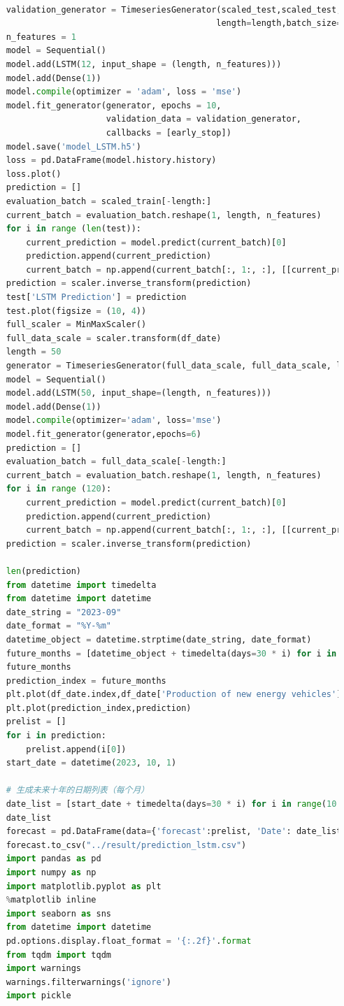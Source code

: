 \documentclass{apmcmthesis}
\begin{document}
\begin{lstlisting}[language=Python,caption={The Python Source code of Algorithm}]
    
    validation_generator = TimeseriesGenerator(scaled_test,scaled_test,
                                              length=length,batch_size=1)
    n_features = 1
    model = Sequential()
    model.add(LSTM(12, input_shape = (length, n_features)))
    model.add(Dense(1))
    model.compile(optimizer = 'adam', loss = 'mse')
    model.fit_generator(generator, epochs = 10, 
                        validation_data = validation_generator, 
                        callbacks = [early_stop])
    model.save('model_LSTM.h5')
    loss = pd.DataFrame(model.history.history)
    loss.plot()
    prediction = []
    evaluation_batch = scaled_train[-length:]
    current_batch = evaluation_batch.reshape(1, length, n_features)
    for i in range (len(test)):
        current_prediction = model.predict(current_batch)[0]
        prediction.append(current_prediction)
        current_batch = np.append(current_batch[:, 1:, :], [[current_prediction]], axis = 1)
    prediction = scaler.inverse_transform(prediction)
    test['LSTM Prediction'] = prediction
    test.plot(figsize = (10, 4))
    full_scaler = MinMaxScaler()
    full_data_scale = scaler.transform(df_date)
    length = 50 
    generator = TimeseriesGenerator(full_data_scale, full_data_scale, length=length, batch_size=1)
    model = Sequential()
    model.add(LSTM(50, input_shape=(length, n_features)))
    model.add(Dense(1))
    model.compile(optimizer='adam', loss='mse')
    model.fit_generator(generator,epochs=6)
    prediction = []
    evaluation_batch = full_data_scale[-length:]
    current_batch = evaluation_batch.reshape(1, length, n_features)
    for i in range (120):
        current_prediction = model.predict(current_batch)[0]
        prediction.append(current_prediction)
        current_batch = np.append(current_batch[:, 1:, :], [[current_prediction]], axis = 1)
    prediction = scaler.inverse_transform(prediction)
    
    len(prediction)
    from datetime import timedelta
    from datetime import datetime
    date_string = "2023-09"
    date_format = "%Y-%m"
    datetime_object = datetime.strptime(date_string, date_format)
    future_months = [datetime_object + timedelta(days=30 * i) for i in range(1, 121)]
    future_months
    prediction_index = future_months
    plt.plot(df_date.index,df_date['Production of new energy vehicles'])
    plt.plot(prediction_index,prediction)
    prelist = []
    for i in prediction:
        prelist.append(i[0])
    start_date = datetime(2023, 10, 1)
    
    # 生成未来十年的日期列表（每个月）
    date_list = [start_date + timedelta(days=30 * i) for i in range(10 * 12)]
    date_list
    forecast = pd.DataFrame(data={'forecast':prelist, 'Date': date_list})
    forecast.to_csv("../result/prediction_lstm.csv")
    import pandas as pd
    import numpy as np
    import matplotlib.pyplot as plt
    %matplotlib inline
    import seaborn as sns
    from datetime import datetime
    pd.options.display.float_format = '{:.2f}'.format
    from tqdm import tqdm
    import warnings
    warnings.filterwarnings('ignore')
    import pickle
    

\end{lstlisting}
\end{document}
